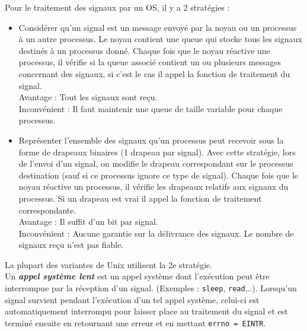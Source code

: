 Pour le traitement des signaux par un OS, il y a 2 stratégies :
\begin{itemize}
  \item Considérer qu'un signal est un message envoyé par la noyau ou un processus à un autre processus. Le noyau contient une queue qui stocke tous les signaux destinés à un processus donné. Chaque fois que le noyau réactive une processus, il vérifie si la queue associé contient un ou plusieurs messages concernant des signaux, si c'est le cas il appel la fonction de traitement du signal.\\
    Avantage : Tout les signaux sont reçu.\\
    Inconvénient : Il faut maintenir une queue de taille variable pour chaque processus.\\
  \item Représenter l'ensemble des signaux qu'un processus peut recevoir sous la forme de drapeaux binaires (1 drapeau par signal). Avec cette stratégie, lors de l'envoi d'un signal, on modifie le drapeau correspondant sur le processus destination (sauf si ce processus ignore ce type de signal). Chaque fois que le noyau réactive un processus, il vérifie les drapeaux relatifs aux signaux du processus. Si un drapeau est vrai il appel la fonction de traitement correspondante. \\
    Avantage : Il suffit d'un bit par signal. \\
    Inconvénient : Aucune garantie sur la délivrance des signaux. Le nombre de signaux reçu n'est pas fiable.
\end{itemize}
La plupart des variantes de Unix utilisent la 2e stratégie. \\

Un \textbf{\textit{appel système lent}} est un appel système dont l'exécution peut être interrompue par la réception d'un signal. (Exemples : \texttt{sleep}, \texttt{read},..). Lorsqu'un signal survient pendant l'exécution d'un tel appel système, celui-ci est automatiquement interrompu pour laisser place au traitement du signal et est terminé ensuite en retournant une erreur et en mettant \texttt{errno = EINTR}.

